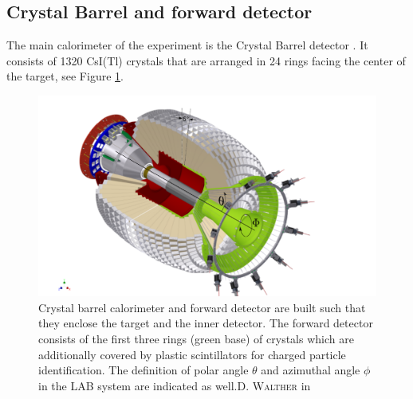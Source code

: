\subsection{Crystal Barrel and forward detector}
\label{sec:cb}
The main calorimeter of the experiment is the Crystal Barrel detector \cite{cbdet}. It consists of 1320 CsI(Tl) crystals that are arranged in 24 rings facing the center of the target, see Figure \ref{fig:cb}.
\begin{figure}[htbp]
	\centering
	\includegraphics[width=\linewidth]{figs/cb_fp_in.pdf}
	\caption{Crystal barrel calorimeter and forward detector are built such that they enclose the target and the inner detector. The forward detector consists of the first three rings (green base) of crystals which are additionally covered by plastic scintillators for charged particle identification. The definition of polar angle $\theta$ and azimuthal angle $\phi$ in the LAB system are indicated as well.\textsc{D. Walther} in \cite{urban}}
	\label{fig:cb}

\end{figure}
